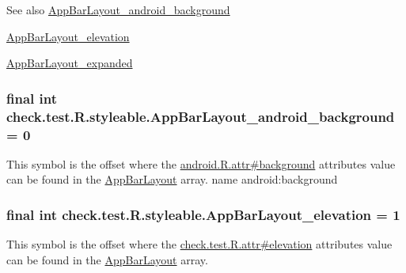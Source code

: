 \begin{DoxySeeAlso}{See also}
\hyperlink{classcheck_1_1test_1_1_r_1_1styleable_a74c1c6d08d529edbb508f5d37e4e292e}{App\+Bar\+Layout\+\_\+android\+\_\+background} 

\hyperlink{classcheck_1_1test_1_1_r_1_1styleable_ab651c6ae78f517b87aa0dd36e0c75dbd}{App\+Bar\+Layout\+\_\+elevation} 

\hyperlink{classcheck_1_1test_1_1_r_1_1styleable_a72cf6dabc14227ec4824c24626692296}{App\+Bar\+Layout\+\_\+expanded} 
\end{DoxySeeAlso}
\hypertarget{classcheck_1_1test_1_1_r_1_1styleable_a74c1c6d08d529edbb508f5d37e4e292e}{}
\subsubsection[{App\+Bar\+Layout\+\_\+android\+\_\+background}]{\setlength{\rightskip}{0pt plus 5cm}final int check.\+test.\+R.\+styleable.\+App\+Bar\+Layout\+\_\+android\+\_\+background = 0\hspace{0.3cm}{\ttfamily [static]}}\label{classcheck_1_1test_1_1_r_1_1styleable_a74c1c6d08d529edbb508f5d37e4e292e}
This symbol is the offset where the \hyperlink{}{android.\+R.\+attr\#background} attribute\textquotesingle{}s value can be found in the \hyperlink{classcheck_1_1test_1_1_r_1_1styleable_ac38bda3bc57af07b7730c8f4a05b2049}{App\+Bar\+Layout} array.  name android\+:background \hypertarget{classcheck_1_1test_1_1_r_1_1styleable_ab651c6ae78f517b87aa0dd36e0c75dbd}{}
\subsubsection[{App\+Bar\+Layout\+\_\+elevation}]{\setlength{\rightskip}{0pt plus 5cm}final int check.\+test.\+R.\+styleable.\+App\+Bar\+Layout\+\_\+elevation = 1\hspace{0.3cm}{\ttfamily [static]}}\label{classcheck_1_1test_1_1_r_1_1styleable_ab651c6ae78f517b87aa0dd36e0c75dbd}
This symbol is the offset where the \hyperlink{classcheck_1_1test_1_1_r_1_1attr_acf20b055f3e563dc5c426990bf2b3b7e}{check.\+test.\+R.\+attr\#elevation} attribute\textquotesingle{}s value can be found in the \hyperlink{classcheck_1_1test_1_1_r_1_1styleable_ac38bda3bc57af07b7730c8f4a05b2049}{App\+Bar\+Layout} array.

